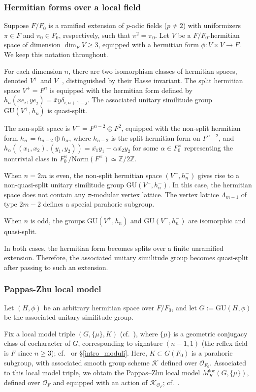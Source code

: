 \documentclass[pdflatex,sn-mathphys-num]{sn-jnl}%
\theoremstyle{thmstyleone}%
\theoremstyle{thmstyletwo}%
\numberwithin{equation}{subsection}
\theoremstyle{thmstylethree}%
\newcommand{\BZ}{\ensuremath{\mathbb{Z}}\xspace}
\newcommand{\CK}{\ensuremath{\mathcal{K}}\xspace}
\newcommand{\CO}{\ensuremath{\mathcal{O}}\xspace}
\newcommand{\GU}{\mathrm{GU}}
\newcommand{\loc}{\ensuremath{\mathrm{loc}}\xspace}
\begin{document}
\subsubsection{Hermitian forms over a local field}
Suppose $F/F_0$ is a ramified extension of $p$-adic fields ($p\neq 2$) with uniformizers $\pi\in F$ and $\pi_0\in F_0$, respectively, such that $\pi^2=\pi_0$. 
Let $V$ be a $F/F_0$-hermitian space of dimension $\dim_F V\geq 3$, equipped with a hermitian form $\phi:V\times V\rightarrow F$. We keep this notation throughout.
		
For each dimension $n$, there are two isomorphism classes of hermitian spaces, denoted $V^+$ and $V^-$, distinguished by their Hasse invariant.
The split hermitian space $V^+=F^n$ is equipped with the hermitian form defined by $h_n(x e_i,y e_j)=\bar{x}y\delta_{i,n+1-j}$. The associated unitary similitude group $\GU(V^+,h_n)$ is quasi-split.

The non-split space is $V^{-}=F^{n-2}\oplus F^2$, equipped with the non-split hermitian form $h_{n}^-=h_{n-2}\oplus h_\alpha$, where $h_{n-2}$ is the split hermitian form on $F^{n-2}$, and $h_\alpha((x_1,x_2),(y_1,y_2))=\overline{x_1}y_1- \alpha\overline{x_2}y_2$ for some $\alpha\in F_0^\times$ representing the nontrivial class in $F_0^\times/\text{Norm}(F^\times)\simeq \BZ/2\BZ$.

When $n=2m$ is even, the non-split hermitian space $(V^-,h_n^-)$ gives rise to a non-quasi-split unitary similitude group $\GU(V^-,h_n^-)$. In this case, the hermitian space does not contain any $\pi$-modular vertex lattice. The vertex lattice $\Lambda_{m-1}$ of type $2m-2$ defines a special parahoric subgroup.

When $n$ is odd, the groups $\GU(V^+,h_n)$ and $\GU(V^-,h_n^-)$ are isomorphic and quasi-split.

In both cases, the hermitian form becomes splits over a finite unramified extension.
Therefore, the associated unitary similitude group becomes quasi-split after passing to such an extension.
		
		
\subsubsection{Pappas-Zhu local model}
Let $(H,\phi)$ be an arbitrary hermitian space over $F/F_0$, and let $G := \GU(H, \phi)$ be the associated unitary similitude group.

Fix a local model triple $(G,\{\mu\},K)$ (cf.\ \cite[\S 2.1]{HPR}), where $\{\mu\}$ is a geometric conjugacy class of cocharacter of $G$, corresponding to signature $(n-1,1)$ (the reflex field is $F$ since $n\geq 3$); cf.\ \cite[\S 2.4]{PR2009} or \S \ref{intro_moduli}. Here, $K\subset G(F_0)$ is a parahoric subgroup, with associated smooth group scheme $\CK$ defined over $\CO_{F_0}$.
Associated to this local model triple, we obtain the Pappas–Zhu local model $M_K^\loc(G,\{\mu\})$, defined over $\CO_F$ and equipped with an action of $\CK_{\CO_F}$; cf.\ \cite[Theorem 2.5]{HPR}.
\end{document}
